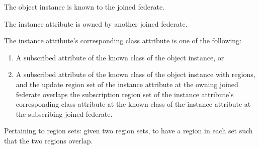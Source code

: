 

\begin{hlalist}
    \item The object instance is known to the joined federate.
    \item The instance attribute is owned by another joined federate.
    \item The instance attribute's corresponding class attribute is one of the following:
    \begin{enumerate}[label=\arabic*),leftmargin=2.2em,labelsep=0.55em,itemsep=1pt,topsep=1pt,parsep=0pt,partopsep=0pt]
  \item A subscribed attribute of the known class of the object instance, or
  \item A subscribed attribute of the known class of the object instance with regions, and the update region set of the instance attribute at the owning joined federate overlaps the subscription region set of the instance attribute's corresponding class attribute at the known class of the instance attribute at the subscribing joined federate.
    \end{enumerate}
\end{hlalist}
\vspace{-12pt}

\begin{hlalist}
    \item Pertaining to region sets: given two region sets, to have a region in each set such that the two regions overlap.
\end{hlalist}

\newpage

